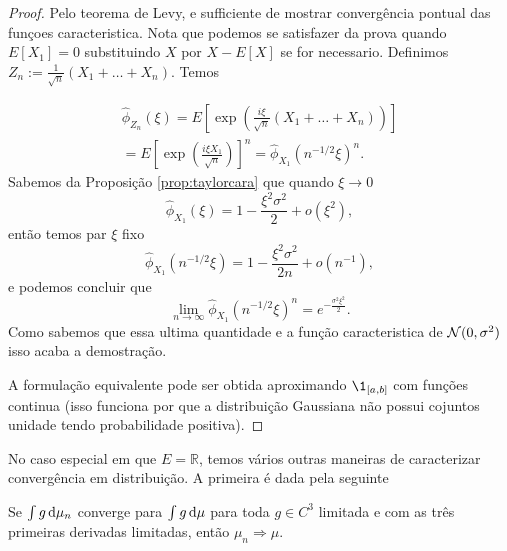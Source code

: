 \begin{proof}
 Pelo teorema de Levy, e sufficiente de mostrar convergência pontual das funçoes caracteristica.
 Nota que podemos se satisfazer da prova quando $E[X_1]=0$ substituindo $X$ por $X-E[X]$ se for necessario.
 Definimos $Z_n:= \frac{1}{\sqrt{n}}\left(X_1+\dots+X_n\right).$
 Temos 
 
 \begin{multline}
  \hat \phi_{Z_n}(\xi)=E\left[\exp\left( \frac{i\xi}{\sqrt{n}}\left(X_1+\dots+X_n\right) \right)  \right]\\=
  E\left[ \exp\left( \frac{i\xi X_1}{\sqrt{n}} \right) \right]^{n}=  \hat \phi_{X_1}(n^{-1/2}\xi)^n.
 \end{multline}
Sabemos da Proposição \ref{prop:taylorcara} que quando $\xi\to 0$
\begin{equation}
 \hat \phi_{X_1}(\xi)= 1-\frac{\xi^2\sigma^2}{2}+o(\xi^2),
\end{equation}
então temos par $\xi$ fixo
\begin{equation}
  \hat \phi_{X_1}(n^{-1/2}\xi)=1- \frac{\xi^2\sigma^2}{2n}+o(n^{-1}),
\end{equation}
e podemos concluir que 
\begin{equation}
 \lim_{n\to \infty} \hat \phi_{X_1}(n^{-1/2}\xi)^n= e^{-\frac{\sigma^2\xi^2}{2}}.
\end{equation}
Como sabemos que essa ultima quantidade e a função caracteristica de ${\mathcal N}(0,\sigma^2)$ isso acaba a demostração.
 
 \medskip
 
 A formulação equivalente pode ser obtida aproximando $\1_{[a,b]}$ com funções continua (isso funciona por que a distribuição Gaussiana não possui cojuntos unidade tendo probabilidade positiva). 
 
\end{proof}





No caso especial em que $E = \mathbb{R}$, temos vários outras maneiras de caracterizar convergência em distribuição.
A primeira é dada pela seguinte

\begin{proposition}
  \label{p:conv_distr_suave}
  Se $\int g \mathop{}\!\mathrm{d} \mu_n$ converge para $\int g \mathop{}\!\mathrm{d} \mu$ para toda $g \in C^3$ limitada e com as três primeiras derivadas limitadas, então $\mu_n \Rightarrow \mu$.
\end{proposition}

